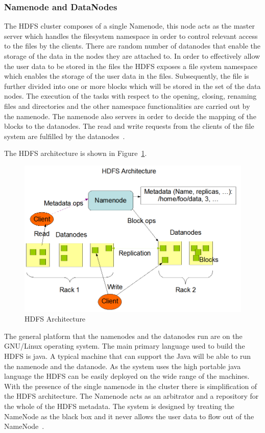 \subsubsection{Namenode and DataNodes}
The HDFS cluster composes of a single Namenode, this node acts as 
the master server which
 handles the filesystem namespace in order to control 
relevant access to the files by the clients.
There are random number of datanodes that enable the 
storage of the data in the nodes
 they are attached to. In order to effectively allow the 
user data to be stored in the 
 files the HDFS exposes a file system namespace which 
enables the storage of the user 
 data in the files. Subsequently, the file is further 
divided into one or more blocks 
 which will be stored in the set of the data nodes. 
The execution of the tasks with 
 respect to the opening, closing, renaming files and directories and the other 
 namespace functionalities are carried out by the namenode. The namenode also 
 servers in order to decide the mapping of the blocks to the datanodes. 
 The read and write requests from the clients of the file system
  are fulfilled by the datanodes~\cite{hid-sp18-412-HDFS-Architecture}.

The HDFS architecture is shown in Figure~\ref{s:archihdfs}.

\begin{figure}[!ht]
\centering\includegraphics[width=\textwidth]{images/HDFSarchi.png}
\caption{HDFS 
Architecture~\cite{hid-sp18-412-HDFS-Architecture}}\label{s:archihdfs}
\end{figure}

The general platform that the namenodes and the datanodes run are on 
the GNU/Linux operating system. The main primary language used to 
build the HDFS is java. A typical machine that can support the 
Java will be able to run the namenode and the datanode. As the 
system uses the high portable java language the HDFS can be 
easily deployed on the wide range of the machines. With the 
presence of the single namenode in the cluster there is simplification 
of the HDFS architecture. The Namenode acts as an arbitrator 
and a repository for the whole of the HDFS metadata. 
The system is designed by treating the NameNode as the 
black box and it never allows the user 
data to flow out of the NameNode~\cite{hid-sp18-412-HDFS-Architecture}.

